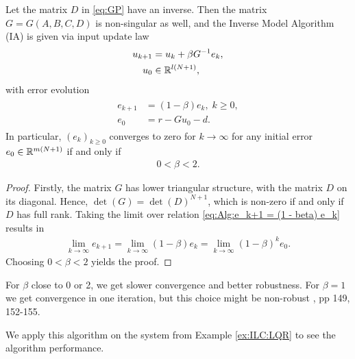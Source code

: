 \begin{alg}
	\label{alg:ILC:IA}
	Let the matrix $D$ in \eqref{eq:GP} have an inverse. Then the matrix $G = G(A, B, C, D)$ is non-singular as well, and the Inverse Model Algorithm (IA) is given via input update law 
	\begin{align}
	\label{eq:errRightInv}
	\begin{split}
	u_{k+1} &= u_k + \beta G^{-1} e_k, \\
	u_0 & \in {\mathbb{R}}^{l (N+1)},
	\end{split}	
	\end{align}
	with error evolution
	\begin{align}
	\label{eq:Alg:e_k+1 = (1 - beta) e_k}
	\begin{split}
	e_{k+1} &= (1- \beta) e_{k}, \; k\geq 0, \\
	e_0 &= r -  Gu_0 -d.
	\end{split}
	\end{align}
	In particular, $(e_k)_{k\geq 0}$ converges to zero for $k \to \infty$ for any initial error $e_0 \in {\mathbb{R}}^{m(N+1)}$ if and only if 
	\begin{align*}
	0 < \beta < 2.
	\end{align*}
\end{alg}
\begin{proof}
	Firstly, the matrix $G$ has lower triangular structure, with the matrix $D$ on its diagonal. Hence, $\det(G) = \det(D)^{N+1}$, which is non-zero if and only if $D$ has full rank. 
	Taking the limit over relation \eqref{eq:Alg:e_k+1 = (1 - beta) e_k} results in
	\begin{align}
	\lim_{k \to \infty} e_{k+1} = \lim_{k \to \infty}(1- \beta) e_{k} = \lim_{k \to \infty}(1 - \beta)^k e_0.
	\end{align}
	Choosing $0<\beta < 2$ yields the proof. 
\end{proof}

For $\beta$ close to 0 or 2, we get slower convergence and better robustness. For $\beta = 1$ we get convergence in one iteration, but this choice might be non-robust \cite{ILC}, pp 149, 152-155.

We apply this algorithm on the system from Example \ref{ex:ILC:LQR} to see the algorithm performance. 


